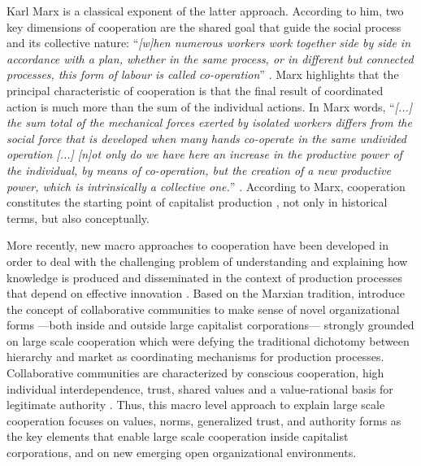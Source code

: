 Karl Marx is a classical exponent of the latter approach. According to him, two key dimensions of cooperation are the shared goal that guide the social process and its collective nature: ``\emph{[w]hen numerous workers work together side by side in accordance with a plan, whether in the same process, or in different but connected processes, this form of labour is called co-operation}'' \citep[443]{marx:1990}. Marx highlights that the principal characteristic of cooperation is that the final result of coordinated action is much more than the sum of the individual actions. In Marx words, ``\emph{[...] the sum total of the mechanical forces exerted by isolated workers differs from the social force that is developed when many hands co-operate in the same undivided operation [...] [n]ot only do we have here an increase in the productive power of the individual, by means of co-operation, but the creation of a new productive power, which is intrinsically a collective one.}'' \citep[443]{marx:1990}. According to Marx, cooperation constitutes the starting point of capitalist production \citep[439]{marx:1990}, not only in historical terms, but also conceptually.

More recently, new macro approaches to cooperation have been developed in order to deal with the challenging problem of understanding and explaining how knowledge is produced and disseminated in the context of production processes that depend on effective innovation \cite{adler:2015}. Based on the Marxian tradition, \citep{adler:2006} introduce the concept of collaborative communities to make sense of novel organizational forms ---both inside and outside large capitalist corporations--- strongly grounded on large scale cooperation which were defying the traditional dichotomy between hierarchy and market \citep{coase:1937,williamson:1975} as coordinating mechanisms for production processes. Collaborative communities are characterized by conscious cooperation, high individual interdependence, trust, shared values and a value-rational basis for legitimate authority \citep{adler:2006,adler:2008}. Thus, this macro level approach to explain large scale cooperation focuses on values, norms, generalized trust, and authority forms as the key elements that enable large scale cooperation inside capitalist corporations, and on new emerging open organizational environments.

